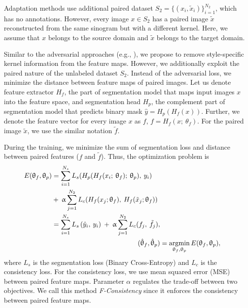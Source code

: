 Adaptation methods use additional paired dataset $S_2 = \{ ( x_i, \tilde{x}_i ) \}_{i=1}^{N_2}$, which has no annotations. However, every image $x \in S_2$ has a paired image $\tilde{x}$ reconstructed from the same sinogram but with a different kernel. Here, we assume that $x$ belongs to the source domain and $\tilde{x}$ belongs to the target domain.

Similar to the adversarial approaches (e.g., \cite{dann}), we propose to remove style-specific kernel information from the feature maps. However, we additionally exploit the paired nature of the unlabeled dataset $S_2$. Instead of the adversarial loss, we minimize the distance between feature maps of paired images. Let us denote feature extractor $H_f$, the part of segmentation model that maps input images $x$ into the feature space, and segmentation head $H_p$, the complement part of segmentation model that predicts binary mask $\hat{y} = H_p \left( H_f \left( x \right) \right)$. Further, we denote the feature vector for every image $x$ as $f$, $f = H_f (x; \: \theta_f)$. For the paired image $\tilde{x}$, we use the similar notation $\tilde{f}$.%

During the training, we minimize the sum of segmentation loss and distance between paired features ($f$ and $\tilde{f}$). Thus, the optimization problem is
\begin{align}
	\label{eq:f-consistency_opt}
	\begin{split}
		E (\uptheta_f, \uptheta_p) &= \sum_{i = 1}^{N_s} L_s (H_p(H_f (x_i; \: \uptheta_f); \: \uptheta_p), \: y_i) \: \\
		& + \: \upalpha \sum_{j = 1}^{N_2} L_c (H_f (x_j; \uptheta_{f}), \: H_f (\tilde{x}_j; \uptheta_f)) \\
		& = \sum_{i = 1}^{N_s} L_s \left(\hat{y}_i ,\: y_i \right) \: + \: \upalpha \sum_{j = 1}^{N_2} L_c (f_j,\: \tilde{f}_j ),  
	\end{split} \\
	(\hat{\uptheta}_f, \hat{\uptheta}_p) & = \operatorname*{argmin}_{\uptheta_f, \uptheta_p} E(\uptheta_f, \uptheta_p),
\end{align}
where $L_s$ is the segmentation loss (Binary Cross-Entropy) and $L_c$ is the consistency loss. For the consistency loss, we use mean squared error (MSE) between paired feature maps. Parameter $\alpha$ regulates the trade-off between two objectives. We call this method \textit{F-Consistency} since it enforces the consistency between paired feature maps.

